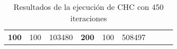 \begin{table}[]
\begin{tabular}{|ccrccrccc}
\multicolumn{1}{|c|}{\multirow{-39}{*}{\cellcolor[HTML]{FFFFC7}\textbf{100}}} & \multicolumn{1}{c|}{\multirow{-9}{*}{\cellcolor[HTML]{DDFDFF}100}} & \multicolumn{1}{r|}{\cellcolor[HTML]{DAE8FC}103480}    & \multicolumn{1}{c|}{\multirow{-39}{*}{\cellcolor[HTML]{FFFFC7}\textbf{200}}} & \multicolumn{1}{c|}{\multirow{-10}{*}{\cellcolor[HTML]{DDFDFF}100}} & \multicolumn{1}{r|}{\cellcolor[HTML]{DDFDFF}508497}    &                                                                              &                                                                    &                                                        \\ \cline{1-6}
\end{tabular}
\caption{\label{CHC450}Resultados de la ejecución de CHC con 450 iteraciones}
\end{table}

